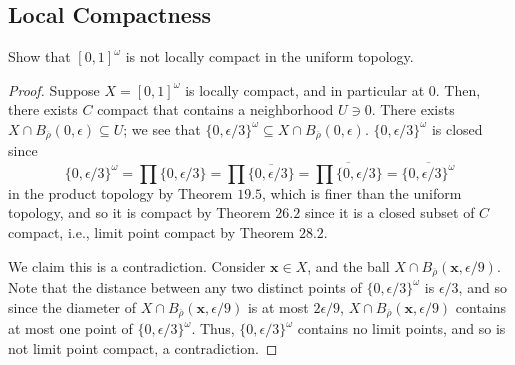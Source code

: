\documentclass[12pt]{article}
\theoremstyle{remark}
\begin{document}
\setcounter{subsection}{28}
\subsection{Local Compactness}
\setcounter{subsubsection}{3}
\begin{problem}
  Show that $[0,1]^\omega$ is not locally compact in the uniform topology.
\end{problem}
\begin{proof}
  Suppose $X = [0,1]^\omega$ is locally compact, and in particular at $0$. Then, there exists $C$ compact that contains a neighborhood $U \ni 0$. There exists $X \cap B_{\overline{\rho}}(0,\epsilon) \subseteq U$; we see that $\{0,\epsilon/3\}^\omega \subseteq X \cap B_{\overline{\rho}}(0,\epsilon)$. $\{0,\epsilon/3\}^\omega$ is closed since
  \begin{equation*}
    \{0,\epsilon/3\}^\omega = \prod \{0,\epsilon/3\} = \prod \overline{\{0,\epsilon/3\}} = \overline{\prod \{0,\epsilon/3\}} = \overline{\{0,\epsilon/3\}^\omega}
  \end{equation*}
  in the product topology by Theorem $19.5$, which is finer than the uniform topology, and so it is compact by Theorem $26.2$ since it is a closed subset of $C$ compact, i.e., limit point compact by Theorem $28.2$.
  \par We claim this is a contradiction. Consider $\mathbf{x} \in X$, and the ball $X \cap B_{\overline{\rho}}(\mathbf{x},\epsilon/9)$. Note that the distance between any two distinct points of $\{0,\epsilon/3\}^\omega$ is $\epsilon/3$, and so since the diameter of $X \cap B_{\overline{\rho}}(\mathbf{x},\epsilon/9)$ is at most $2\epsilon/9$, $X \cap B_{\overline{\rho}}(\mathbf{x},\epsilon/9)$ contains at most one point of $\{0,\epsilon/3\}^\omega$. Thus, $\{0,\epsilon/3\}^\omega$ contains no limit points, and so is not limit point compact, a contradiction.
\end{proof}
\end{document}
